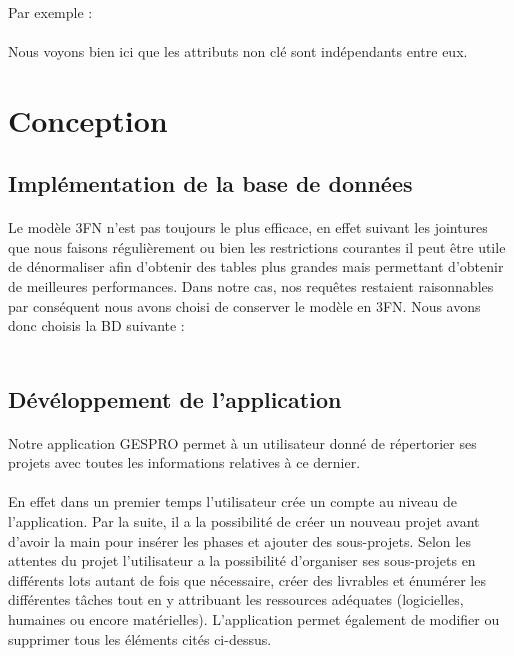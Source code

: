 \documentclass[a4paper, 12pt]{article}
\begin{document}
\paragraph{}Par exemple :

\paragraph{}Nous voyons bien ici que les attributs non clé sont indépendants entre eux.

\newpage

\section{Conception}
\subsection{Implémentation de la base de données}
\paragraph{}Le modèle 3FN n'est pas toujours le plus efficace, en effet suivant les jointures que nous faisons régulièrement ou bien les restrictions courantes il peut être utile de dénormaliser afin d'obtenir des tables plus grandes mais permettant d’obtenir de meilleures performances. Dans notre cas, nos requêtes restaient raisonnables par conséquent nous avons choisi de conserver le modèle en 3FN. Nous avons donc choisis la BD suivante :
\\ \\

\newpage
\subsection{Dévéloppement de l'application}
\paragraph{}Notre application GESPRO permet à un utilisateur donné de répertorier ses projets avec toutes les informations relatives à ce dernier.
\paragraph{}En effet dans un premier temps l’utilisateur crée un compte au niveau de l’application. Par la suite, il a la possibilité de créer un nouveau projet avant d’avoir la main pour insérer les phases et ajouter des sous-projets. Selon les attentes du projet l’utilisateur a la possibilité d’organiser ses sous-projets en différents lots autant de fois que nécessaire,  créer des livrables et énumérer les différentes tâches tout en y attribuant les ressources adéquates (logicielles, humaines ou encore matérielles). L’application permet également de modifier ou supprimer tous les éléments cités ci-dessus. 
\end{document}
